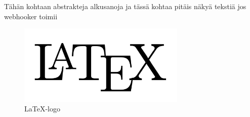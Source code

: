 \documentclass[12pt]{report} %
\begin{document}
    Tähän kohtaan abstrakteja alkusanoja ja tässä kohtaa pitäis näkyä tekstiä jos webhooker toimii

    \begin{figure}[H] %
        \centering
        \includegraphics[width=8cm]{latex.png}
        \caption{\LaTeX -logo} %
        \label{img:myimg.jpg} %
        \end{figure}
    

    
    
    
\end{document}
